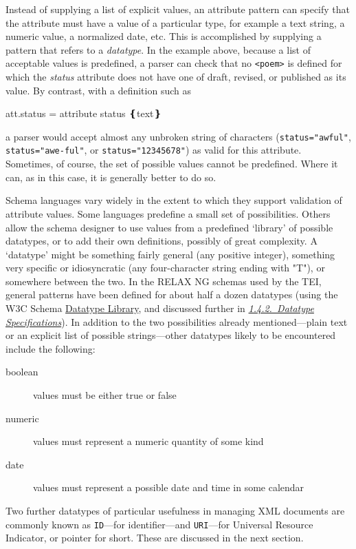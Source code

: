 Instead of supplying a list of explicit values, an attribute pattern can specify that the attribute must have a value of a particular type, for example a text string, a numeric value, a normalized date, etc. This is accomplished by supplying a pattern that refers to a \textit{datatype}. In the example above, because a list of acceptable values is predefined, a parser can check that no \texttt{<poem>} is defined for which the {\itshape status} attribute does not have one of draft, revised, or published as its value. By contrast, with a definition such as \par\hfill\bgroup\exampleFont\vskip 10pt\begin{shaded}
\obeyspaces att.status =\newline
attribute status ❴text❵\end{shaded}
\par\egroup 
 a parser would accept almost any unbroken string of characters (\texttt{status="awful"}, \texttt{status="awe-ful"}, or \texttt{status="12345678"}) as valid for this attribute. Sometimes, of course, the set of possible values cannot be predefined. Where it can, as in this case, it is generally better to do so.\par
Schema languages vary widely in the extent to which they support validation of attribute values. Some languages predefine a small set of possibilities. Others allow the schema designer to use values from a predefined ‘library’ of possible datatypes, or to add their own definitions, possibly of great complexity. A ‘datatype’ might be something fairly general (any positive integer), something very specific or idiosyncratic (any four-character string ending with "T"), or somewhere between the two. In the RELAX NG schemas used by the TEI, general patterns have been defined for about half a dozen datatypes (using the W3C Schema \hyperref[XSD2]{Datatype Library}, and discussed further in \textit{\hyperref[DTYPES]{1.4.2.\ Datatype Specifications}}). In addition to the two possibilities already mentioned—plain text or an explicit list of possible strings—other datatypes likely to be encountered include the following: \begin{description}

\item[{boolean}]values must be either true or false
\item[{numeric}]values must represent a numeric quantity of some kind
\item[{date}]values must represent a possible date and time in some calendar
\end{description} \par
Two further datatypes of particular usefulness in managing XML documents are commonly known as \texttt{ID}—for identifier—and \texttt{URI}—for Universal Resource Indicator, or pointer for short. These are discussed in the next section.
